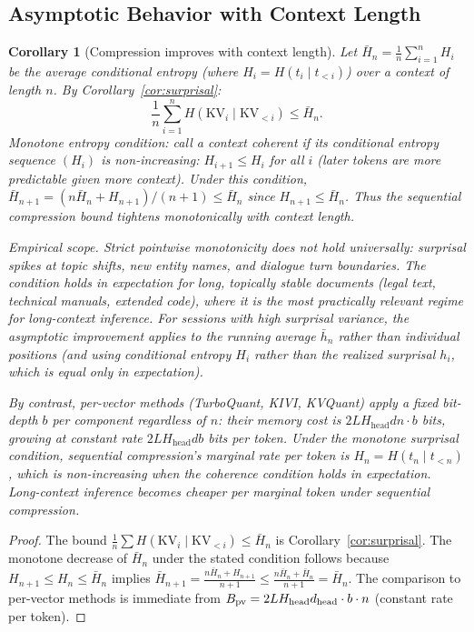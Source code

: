 \documentclass[11pt]{article}
\newtheorem{corollary}{Corollary}
\begin{document}
\subsection{Asymptotic Behavior with Context Length}

\begin{corollary}[Compression improves with context length]
\label{cor:asymptotic}
Let $\bar{H}_n = \frac{1}{n}\sum_{i=1}^n H_i$ be the average conditional entropy
(where $H_i = H(t_i \mid t_{<i})$) over a context of length $n$.
By Corollary~\ref{cor:surprisal}:
\[
  \frac{1}{n}\sum_{i=1}^n H(\mathrm{KV}_i \mid \mathrm{KV}_{<i}) \leq \bar{H}_n.
\]
\emph{Monotone entropy condition:} call a context \emph{coherent} if its
conditional entropy sequence $(H_i)$ is non-increasing: $H_{i+1} \leq H_i$ for
all $i$ (later tokens are more predictable given more context).  Under this
condition, $\bar{H}_{n+1} = (n\bar{H}_n + H_{n+1})/(n+1) \leq \bar{H}_n$ since
$H_{n+1} \leq \bar{H}_n$.  Thus the sequential compression bound tightens
monotonically with context length.

\emph{Empirical scope.}  Strict pointwise monotonicity does not hold universally:
surprisal spikes at topic shifts, new entity names, and dialogue turn boundaries.
The condition holds \emph{in expectation} for long, topically stable documents
(legal text, technical manuals, extended code), where it is the most practically
relevant regime for long-context inference.  For sessions with high surprisal
variance, the asymptotic improvement applies to the running average $\bar{h}_n$
rather than individual positions (and using conditional entropy $H_i$ rather than the realized surprisal $h_i$, which is equal only in expectation).

By contrast, per-vector methods (TurboQuant, KIVI, KVQuant) apply a fixed
bit-depth $b$ per component regardless of $n$: their memory cost is
$2LH_{\mathrm{head}}dn \cdot b$ bits, growing at constant rate $2LH_{\mathrm{head}}db$ bits per token.  Under
the monotone surprisal condition, sequential compression's marginal rate per
token is $H_n = H(t_n \mid t_{<n})$, which is non-increasing when the coherence condition holds in expectation.  Long-context inference
becomes cheaper per marginal token under sequential compression.
\end{corollary}

\begin{proof}
The bound $\frac{1}{n}\sum H(\mathrm{KV}_i \mid \mathrm{KV}_{<i}) \leq \bar{H}_n$
is Corollary~\ref{cor:surprisal}.  The monotone decrease of $\bar{H}_n$ under the
stated condition follows because $H_{n+1} \leq H_n \leq \bar{H}_n$ implies
$\bar{H}_{n+1} = \frac{n\bar{H}_n + H_{n+1}}{n+1} \leq \frac{n\bar{H}_n + \bar{H}_n}{n+1}
= \bar{H}_n$.  The comparison to per-vector methods is immediate from
$B_{\rm pv} = 2LH_{\mathrm{head}}d_{\mathrm{head}} \cdot b \cdot n$ (constant rate per token).
\end{proof}
\end{document}
